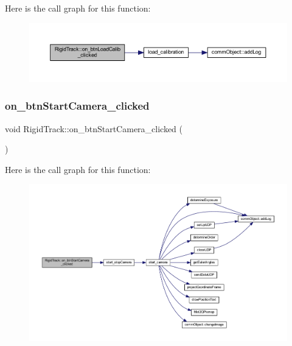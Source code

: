 Here is the call graph for this function\+:\nopagebreak
\begin{figure}[H]
\begin{center}
\leavevmode
\includegraphics[width=350pt]{class_rigid_track_a2224d3f6d923a1c7bad356f49d7a4124_cgraph}
\end{center}
\end{figure}
\mbox{\label{class_rigid_track_a2f226856e28868c8bb1854fa16531f60}} 
\subsubsection{\texorpdfstring{on\+\_\+btn\+Start\+Camera\+\_\+clicked}{on\_btnStartCamera\_clicked}}
{\footnotesize\ttfamily void Rigid\+Track\+::on\+\_\+btn\+Start\+Camera\+\_\+clicked (\begin{DoxyParamCaption}{ }\end{DoxyParamCaption})\hspace{0.3cm}{\ttfamily [slot]}}

Here is the call graph for this function\+:\nopagebreak
\begin{figure}[H]
\begin{center}
\leavevmode
\includegraphics[width=350pt]{class_rigid_track_a2f226856e28868c8bb1854fa16531f60_cgraph}
\end{center}
\end{figure}
\mbox{\label{class_rigid_track_afb1a4edcacc818db4ec6bb017dd07e0f}} 
